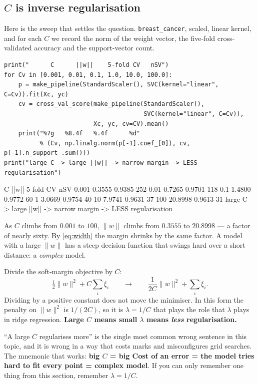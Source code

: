 \documentclass[11pt]{article}
\begin{document}
\subsection{$C$ is inverse regularisation}
\label{sec:invreg}

Here is the sweep that settles the question. \texttt{breast\_cancer}, scaled,
linear kernel, and for each $C$ we record the norm of the weight vector, the
five-fold cross-validated accuracy and the support-vector count.

\begin{lstlisting}
print("      C      ||w||    5-fold CV   nSV")
for Cv in [0.001, 0.01, 0.1, 1.0, 10.0, 100.0]:
    p = make_pipeline(StandardScaler(), SVC(kernel="linear", C=Cv)).fit(Xc, yc)
    cv = cross_val_score(make_pipeline(StandardScaler(),
                                       SVC(kernel="linear", C=Cv)),
                         Xc, yc, cv=CV).mean()
    print("%7g   %8.4f   %.4f      %d"
          % (Cv, np.linalg.norm(p[-1].coef_[0]), cv, p[-1].n_support_.sum()))
print("large C -> large ||w|| -> narrow margin -> LESS regularisation")
\end{lstlisting}
\begin{codeout}
      C      ||w||    5-fold CV   nSV
  0.001     0.3555   0.9385      252
   0.01     0.7265   0.9701      118
    0.1     1.4800   0.9772      60
      1     3.0669   0.9754      40
     10     7.9741   0.9631      37
    100    20.8998   0.9613      31
large C -> large ||w|| -> narrow margin -> LESS regularisation
\end{codeout}

As $C$ climbs from $0.001$ to $100$, $\|w\|$ climbs from $0.3555$ to
$20.8998$ --- a factor of nearly sixty. By \eqref{eq:width} the margin shrinks
by the same factor. A model with a large $\|w\|$ has a steep decision function
that swings hard over a short distance: a \emph{complex} model.

\begin{keyidea}
Divide the soft-margin objective by $C$:
\[
  \tfrac12\|w\|^2 + C\sum_i \xi_i
  \qquad\longrightarrow\qquad
  \frac{1}{2C}\|w\|^2 + \sum_i \xi_i .
\]
Dividing by a positive constant does not move the minimiser. In this form the
penalty on $\|w\|^2$ is $1/(2C)$, so it is $\lambda = 1/C$ that plays the role
that $\lambda$ plays in ridge regression. \textbf{Large $C$ means small
$\lambda$ means \emph{less} regularisation.}
\end{keyidea}

\begin{caution}
``A large $C$ regularises more'' is the single most common wrong sentence in
this topic, and it is wrong in a way that costs marks and misconfigures grid
searches. The mnemonic that works: \textbf{big $C$ = big Cost of an error = the
model tries hard to fit every point = complex model}. If you can only remember
one thing from this section, remember $\lambda = 1/C$.
\end{caution}
\end{document}
